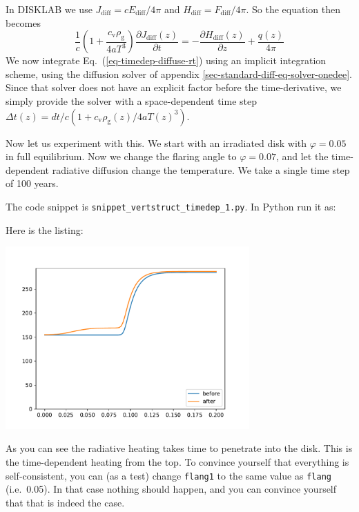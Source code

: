 \documentclass{book}
\newcommand{\code}[1]{{\small\tt #1}}
\begin{document}
In {\sf DISKLAB} we
use $J_{\mathrm{diff}}=cE_{\mathrm{diff}}/4\pi$ and
$H_{\mathrm{diff}}=F_{\mathrm{diff}}/4\pi$. So the equation then becomes
\begin{equation}\label{eq-timedep-diffuse-rt}
\frac{1}{c}\left(1+\frac{c_{\mathrm{v}}\rho_{\mathrm{g}}}{4aT^3}\right)
  \frac{\partial J_{\mathrm{diff}}(z)}{\partial t}
  = -\frac{\partial H_{\mathrm{diff}}(z)}{\partial z} + \frac{q(z)}{4\pi}
\end{equation}
We now integrate Eq.~(\ref{eq-timedep-diffuse-rt}) using an implicit integration
scheme, using the diffusion solver of appendix
\ref{sec-standard-diff-eq-solver-onedee}. Since that solver does not have an
explicit factor before the time-derivative, we simply provide the solver with a
space-dependent time step $\Delta
t(z)=dt/c(1+c_{\mathrm{v}}\rho_{\mathrm{g}}(z)/4aT(z)^3)$.

Now let us experiment with this. We start with an irradiated disk with
$\varphi=0.05$ in full equilibrium. Now we change the flaring angle to
$\varphi=0.07$, and let the time-dependent radiative diffusion change the
temperature. We take a single time step of 100 years.

The code snippet is
\code{snippet\_vertstruct\_timedep\_1.py}. In Python run it as:
\begin{codebox}
\end{codebox}
Here is the listing:

\centerline{\includegraphics[width=0.7\textwidth]{../snippets/fig_snippet_vertstruct_timedep_1_1.pdf}}

As you can see the radiative heating takes time to penetrate into the disk. This is
the time-dependent heating from the top. To convince yourself that everything is
self-consistent, you can (as a test) change \code{flang1} to the same value as
\code{flang} (i.e.~0.05). In that case nothing should happen, and you can convince
yourself that that is indeed the case.
\end{document}

